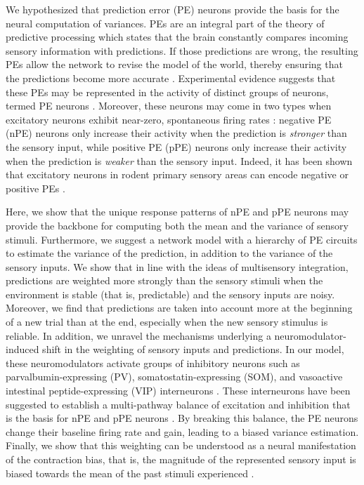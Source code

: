 \documentclass[10pt,a4paper]{article}
\begin{document}
We hypothesized that prediction error (PE) neurons provide the basis for the neural computation of variances. PEs are an integral part of the theory of predictive processing which states that the brain constantly compares incoming sensory information with predictions. If those predictions are wrong, the resulting PEs allow the network to revise the model of the world, thereby ensuring that the predictions become more accurate \citep{keller2018predictive}. Experimental evidence suggests that these PEs may be represented in the activity of distinct groups of neurons, termed PE neurons \citep{eliades2008neural, keller2009neural, ayaz2019layer, audette2021temporally}. Moreover, these neurons may come in two types when excitatory neurons exhibit near-zero, spontaneous firing rates \citep{rao1999predictive, keller2018predictive}: negative PE (nPE) neurons only increase their activity when the prediction is \textit{stronger} than the sensory input, while positive PE (pPE) neurons only increase their activity when the prediction is \textit{weaker} than the sensory input. Indeed, it has been shown that excitatory neurons in rodent primary sensory areas can encode negative or positive PEs \citep{keller2012sensorimotor, attinger2017visuomotor, jordan2020opposing, audette2021temporally}. 

Here, we show that the unique response patterns of nPE and pPE neurons may provide the backbone for computing both the mean and the variance of sensory stimuli. Furthermore, we suggest a network model with a hierarchy of PE circuits to estimate the variance of the prediction, in addition to the variance of the sensory inputs. We show that in line with the ideas of multisensory integration, predictions are weighted more strongly than the sensory stimuli when the environment is stable (that is, predictable) and the sensory inputs are noisy. Moreover, we find that predictions are taken into account more at the beginning of a new trial than at the end, especially when the new sensory stimulus is reliable. In addition, we unravel the mechanisms underlying a neuromodulator-induced shift in the weighting of sensory inputs and predictions. In our model, these neuromodulators activate groups of inhibitory neurons such as parvalbumin-expressing (PV), somatostatin-expressing (SOM), and vasoactive intestinal peptide-expressing (VIP) interneurons \citep{markram2004interneurons, rudy2011three, pfeffer2013inhibition, jiang2015principles, tremblay2016gabaergic, campagnola2022local}. These interneurons have been suggested to establish a multi-pathway balance of excitation and inhibition that is the basis for nPE and pPE neurons \citep{hertag2020learning, hertag2022prediction}. By breaking this balance, the PE neurons change their baseline firing rate and gain, leading to a biased variance estimation. Finally, we show that this weighting can be understood as a neural manifestation of the contraction bias, that is, the magnitude of the represented sensory input is biased towards the mean of the past stimuli experienced \citep{hollingworth1910central, jazayeri2010temporal, ashourian2011bayesian, petzschner2011iterative, akrami2018posterior, meirhaeghe2021precise}. 
\end{document}
